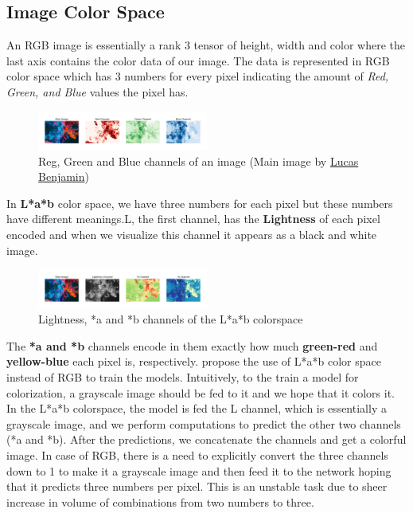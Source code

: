 \documentclass[conference]{IEEEtran}
\begin{document}
\subsection{Image Color Space}
\hspace*{0.25 in}An RGB image is essentially a rank 3 tensor of height, width and color where the last axis contains the color data of our image. The data is represented in RGB color space which has 3 numbers for every pixel indicating the amount of \textit{Red, Green, and Blue} values the pixel has.
\begin{figure}[!htb]
\begin{center}
	\includegraphics[width=0.5\textwidth]{figures/rgb_colorspace}
	\caption{Reg, Green and Blue channels of an image (Main image by \href{https://unsplash.com/@aznbokchoy}{Lucas Benjamin})}
	\label{rgb_colorspace}
\end{center}
\end{figure}
In \textbf{L*a*b} color space, we have three numbers for each pixel but these numbers have different meanings.L, the first channel, has the \textbf{Lightness} of each pixel encoded and when we visualize this channel it appears as a black and white image.
\begin{figure}[!htb]
\begin{center}
	\includegraphics[width=0.5\textwidth]{figures/Lab_colorspace}
	\caption{Lightness, *a and *b channels of the L*a*b colorspace}
	\label{lab_colorspace}
\end{center}
\end{figure}
The \textbf{*a and *b} channels encode in them exactly how much \textbf{green-red} and \textbf{yellow-blue} each pixel is, respectively.
\cite{guadarrama2017pixcolor,isola2018imagetoimage} propose the use of L*a*b color space instead of RGB to train the models. Intuitively, to the train a model for colorization, a grayscale image should be fed to it and we hope that it colors it. In the L*a*b colorspace, the model is fed the L channel, which is essentially a grayscale image, and we perform computations to predict the other two channels (*a and *b). After the predictions, we concatenate the channels and get a colorful image. In case of RGB, there is a need to explicitly convert the three channels down to 1 to make it a grayscale image and then feed it to the network hoping that it predicts three numbers per pixel. This is an unstable task due to sheer increase in volume of combinations from two numbers to three.
\end{document}
